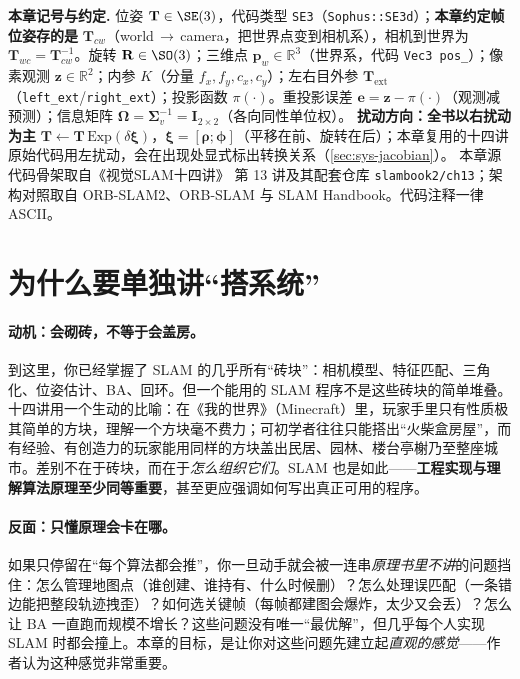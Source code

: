 \begin{note}
\textbf{本章记号与约定.}\;
位姿 $\mathbf{T}\in\SE(3)$，代码类型 \texttt{SE3}（\texttt{Sophus::SE3d}）；\textbf{本章约定帧位姿存的是} $\mathbf{T}_{cw}$（world\,$\to$\,camera，把世界点变到相机系），相机到世界为 $\mathbf{T}_{wc}=\mathbf{T}_{cw}^{-1}$。旋转 $\mathbf{R}\in\SO(3)$；三维点 $\mathbf{p}_w\in\mathbb{R}^3$（世界系，代码 \texttt{Vec3 pos\_}）；像素观测 $\mathbf{z}\in\mathbb{R}^2$；内参 $K$（分量 $f_x,f_y,c_x,c_y$）；左右目外参 $\mathbf{T}_{\mathrm{ext}}$（\texttt{left\_ext}/\texttt{right\_ext}）；投影函数 $\pi(\cdot)$。重投影误差 $\mathbf{e}=\mathbf{z}-\pi(\cdot)$（观测减预测）；信息矩阵 $\boldsymbol\Omega=\boldsymbol\Sigma_v^{-1}=\mathbf{I}_{2\times2}$（各向同性单位权）。
\textbf{扰动方向：全书以右扰动为主} $\mathbf{T}\leftarrow\mathbf{T}\,\mathrm{Exp}(\delta\boldsymbol\xi)$，$\boldsymbol\xi=[\boldsymbol\rho;\boldsymbol\phi]$（平移在前、旋转在后）；本章复用的十四讲原始代码用左扰动，会在出现处显式标出转换关系（\cref{sec:sys-jacobian}）。
本章源代码骨架取自《视觉SLAM十四讲》\cite{gaoxiang2019slam14} 第 13 讲及其配套仓库 \texttt{slambook2/ch13}；架构对照取自 ORB-SLAM2\cite{murartal2017orbslam2}、ORB-SLAM\cite{murartal2015orbslam} 与 SLAM Handbook\cite{carlone2026handbook}。代码注释一律 ASCII。
\end{note}

\section{为什么要单独讲“搭系统”}
\label{sec:sys-why}

\paragraph{动机：会砌砖，不等于会盖房。}
到这里，你已经掌握了 SLAM 的几乎所有“砖块”：相机模型、特征匹配、三角化、位姿估计、BA、回环。但一个能用的 SLAM 程序不是这些砖块的简单堆叠。十四讲用一个生动的比喻\cite{gaoxiang2019slam14}：在《我的世界》（Minecraft）里，玩家手里只有性质极其简单的方块，理解一个方块毫不费力；可初学者往往只能搭出“火柴盒房屋”，而有经验、有创造力的玩家能用同样的方块盖出民居、园林、楼台亭榭乃至整座城市。差别不在于砖块，而在于\emph{怎么组织它们}。SLAM 也是如此——\textbf{工程实现与理解算法原理至少同等重要}，甚至更应强调如何写出真正可用的程序。

\paragraph{反面：只懂原理会卡在哪。}
如果只停留在“每个算法都会推”，你一旦动手就会被一连串\emph{原理书里不讲}的问题挡住：怎么管理地图点（谁创建、谁持有、什么时候删）？怎么处理误匹配（一条错边能把整段轨迹拽歪）？如何选关键帧（每帧都建图会爆炸，太少又会丢）？怎么让 BA 一直跑而规模不增长？这些问题没有唯一“最优解”，但几乎每个人实现 SLAM 时都会撞上。本章的目标，是让你对这些问题先建立起\emph{直观的感觉}——作者认为这种感觉非常重要。

